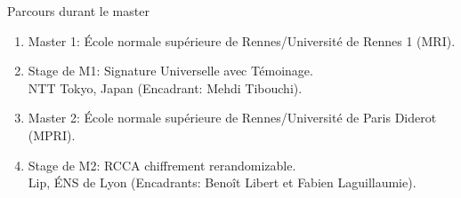 \begin{frame}{Parcours durant le master}
  
  \begin{enumerate}
  \item Master 1: \'Ecole normale sup\'erieure de Rennes/Universit\'e de Rennes 1 (MRI).
  \item Stage de M1: Signature Universelle avec T\'emoinage. \\NTT Tokyo, Japan (Encadrant: Mehdi Tibouchi).
  \item Master 2: \'Ecole normale sup\'erieure de Rennes/Universit\'e de Paris Diderot (MPRI).
  \item Stage de M2: RCCA chiffrement rerandomizable. \\Lip, \'ENS de Lyon (Encadrants: Beno\^it Libert et Fabien Laguillaumie).
  \end{enumerate}
  
\end{frame}